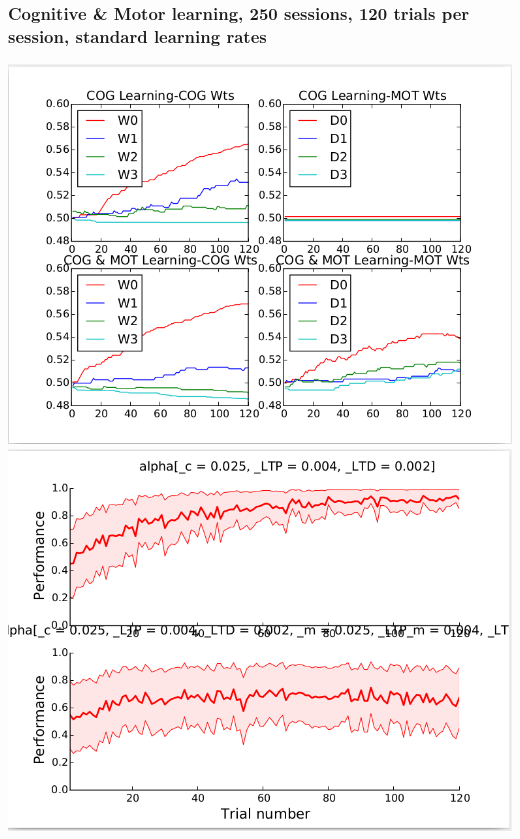 \documentclass[11pt]{article}
\begin{document}
\subsubsection{Cognitive \& Motor learning, 250 sessions, 120 trials per session, standard learning rates}
\includegraphics[clip=true, trim=15 15 0 15, scale=.5]{weights_same_rates.png}
\includegraphics[clip=true, trim=15 15 0 15, scale=.5]{perf_same_rates.png}
\end{document}
